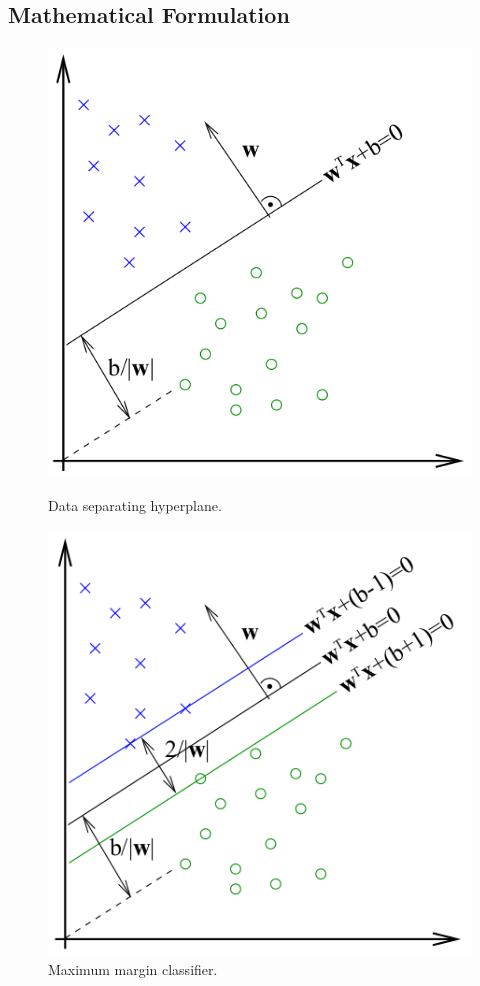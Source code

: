 \subsection{Mathematical Formulation}
\begin{figure}
\centering
\begin{minipage}{.5\textwidth}
  \centering
  \includegraphics[width=.95\textwidth]{figures/SVMFigure1.png}
  \caption{Data separating hyperplane.}
  \label{fig:SVM1}
\end{minipage}%
\begin{minipage}{.5\textwidth}
  \centering
  \includegraphics[width=.95\textwidth]{figures/SVMFigure2.png}
  \caption{Maximum margin classifier.}
  \label{fig:SVM2}
\end{minipage}
\end{figure}

